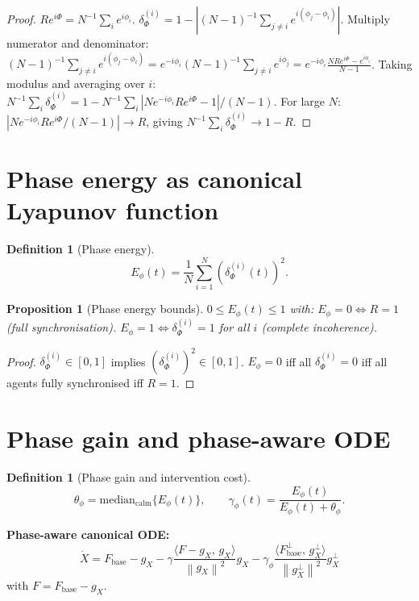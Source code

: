 \documentclass[11pt,a4paper,openany]{book}
\newtheorem{proposition}[theorem]{Proposition}
\theoremstyle{definition}
\newtheorem{definition}[theorem]{Definition}
\newcommand{\norm}[1]{\left\|#1\right\|}
\newcommand{\inner}[2]{\langle #1,\,#2\rangle}
\newcommand{\Fbase}{F_{\mathrm{base}}}
\newcommand{\gX}{g_X}
\begin{document}
\begin{proof}
$Re^{i\Phi} = N^{-1}\sum_i e^{i\phi_i}$.
$\delta_\Phi^{(i)} = 1 - |(N-1)^{-1}\sum_{j\neq i}e^{i(\phi_j-\phi_i)}|$.
Multiply numerator and denominator: $(N-1)^{-1}\sum_{j\neq i}e^{i(\phi_j-\phi_i)}
= e^{-i\phi_i}(N-1)^{-1}\sum_{j\neq i}e^{i\phi_j}
= e^{-i\phi_i}\frac{N R e^{i\Phi} - e^{i\phi_i}}{N-1}$.
Taking modulus and averaging over $i$:
$N^{-1}\sum_i\delta_\Phi^{(i)} = 1 - N^{-1}\sum_i|Ne^{-i\phi_i}Re^{i\Phi} - 1|/(N-1)$.
For large $N$: $|Ne^{-i\phi_i}Re^{i\Phi}/(N-1)| \to R$, giving $N^{-1}\sum_i\delta_\Phi^{(i)} \to 1 - R$.
\end{proof}

\section{Phase energy as canonical Lyapunov function}

\begin{definition}[Phase energy]
\[
E_\phi(t) = \frac{1}{N}\sum_{i=1}^N \left(\delta_\Phi^{(i)}(t)\right)^2.
\]
\end{definition}

\begin{proposition}[Phase energy bounds]
$0 \leq E_\phi(t) \leq 1$ with:
$E_\phi = 0 \iff R = 1$ (full synchronisation).
$E_\phi = 1 \iff \delta_\Phi^{(i)} = 1$ for all $i$ (complete incoherence).
\end{proposition}

\begin{proof}
$\delta_\Phi^{(i)} \in [0,1]$ implies $(\delta_\Phi^{(i)})^2 \in [0,1]$.
$E_\phi = 0$ iff all $\delta_\Phi^{(i)} = 0$ iff all agents fully synchronised iff $R = 1$.
\end{proof}

\section{Phase gain and phase-aware ODE}

\begin{definition}[Phase gain and intervention cost]
\[
\theta_\phi = \mathrm{median}_\text{calm}\{E_\phi(t)\}, \qquad
\gamma_\phi(t) = \frac{E_\phi(t)}{E_\phi(t)+\theta_\phi}.
\]
\end{definition}

\begin{lockedbox}
\textbf{Phase-aware canonical ODE:}
\[
\dot X = \Fbase - \gX - \gamma\frac{\inner{F-\gX}{\gX}}{\norm{\gX}^2}\gX
- \gamma_\phi\frac{\inner{\Fbase^\perp}{\gX^\perp}}{\norm{\gX^\perp}^2}\gX^\perp
\]
with $F = \Fbase - \gX$.
\end{lockedbox}
\end{document}
